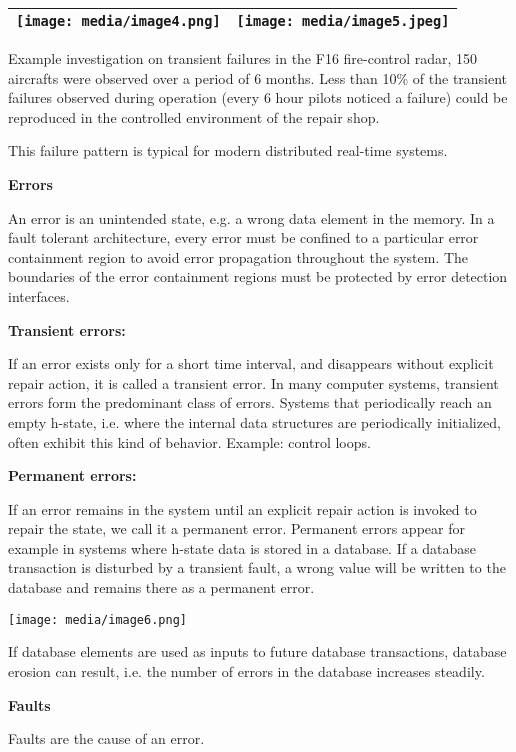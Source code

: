 \begin{longtable}[c]{@{}ll@{}}
\toprule
\texttt{[image: media/image4.png]} &
\texttt{[image: media/image5.jpeg]}\tabularnewline
\bottomrule
\end{longtable}

Example investigation on transient failures in the F16 fire-control
radar, 150 aircrafts were observed over a period of 6 months. Less than
10\% of the transient failures observed during operation (every 6 hour
pilots noticed a failure) could be reproduced in the controlled
environment of the repair shop.

This failure pattern is typical for modern distributed real-time
systems.

\textbf{Errors}

An error is an unintended state, e.g. a wrong data element in the
memory. In a fault tolerant architecture, every error must be confined
to a particular error containment region to avoid error propagation
throughout the system. The boundaries of the error containment regions
must be protected by error detection interfaces.

\textbf{Transient errors:}

If an error exists only for a short time interval, and disappears
without explicit repair action, it is called a transient error. In many
computer systems, transient errors form the predominant class of errors.
Systems that periodically reach an empty h-state, i.e. where the
internal data structures are periodically initialized, often exhibit
this kind of behavior. Example: control loops.

\textbf{Permanent errors:}

If an error remains in the system until an explicit repair action is
invoked to repair the state, we call it a permanent error. Permanent
errors appear for example in systems where h-state data is stored in a
database. If a database transaction is disturbed by a transient fault, a
wrong value will be written to the database and remains there as a
permanent error.

\texttt{[image: media/image6.png]}

If database elements are used as inputs to future database transactions,
database erosion can result, i.e. the number of errors in the database
increases steadily.

\textbf{Faults}

Faults are the cause of an error.

